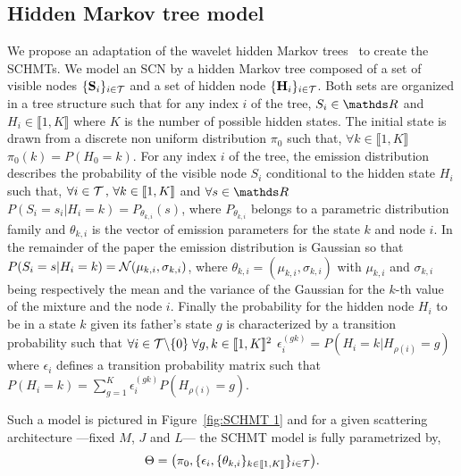 \documentclass{article}
\begin{document}
  \subsection{Hidden Markov tree model}
    \label{subsec:SCHMT/HMT model}
    We propose an adaptation of the wavelet hidden Markov trees~\cite{Crouse and Durand} to create the SCHMTs. We model an SCN by a hidden Markov tree composed of a set of visible nodes $\{{\bf S}_{i}\}_{i \in \mathcal{T}}$ and a set of hidden node $\{{\bf H}_{i}\}_{i \in \mathcal{T}}$. Both sets are organized in a tree structure such that for any index $i$ of the tree, $S_{i} \in \dsR$ and $H_{i} \in \llbracket 1,K \rrbracket$ where $K$ is the number of possible hidden states.
    The initial state is drawn from a discrete non uniform distribution $\pi_{0}$ such that, $\forall k \in \llbracket 1,K \rrbracket$ $\pi_{0}(k) = P(H_{0}=k)$.
    For any index $i$ of the tree, the emission distribution describes the probability of the visible node $S_{i}$ conditional to the hidden state $H_{i}$ such that, $\forall i \in \mathcal{T} \, ,\, \forall k \in \llbracket1,K\rrbracket$ and $\forall s \in \dsR$ $P(S_{i}=s_{i}|H_{i}=k) = P_{\theta_{k,i}}(s)$, where $P_{\theta_{k,i}}$ belongs to a parametric distribution family and $\theta_{k,i}$ is the vector of emission parameters for the state $k$ and node $i$. In the remainder of the paper the emission distribution is Gaussian so that $P(S_{i}=s | H_{i}=k) = \mathcal{N}(\mu_{k,i},\sigma_{k,i})$, where $\theta_{k,i}=(\mu_{k,i},\sigma_{k,i})$ with $\mu_{k,i}$ and $\sigma_{k,i}$ being respectively the mean and the variance of the Gaussian for the $k$-th value of the mixture and the node $i$.
    Finally the probability for the hidden node $H_{i}$ to be in a state $k$ given its father's state $g$ is characterized by a transition probability such that $\forall i \in \mathcal{T} \backslash \{ 0 \} \; \forall g,k \in \llbracket1,K\rrbracket^{2}$ $\epsilon_{i}^{(gk)} = P(H_{i}= k | H_{\rho(i)}=g)$ where $\epsilon_{i}$ defines a transition probability matrix such that $P(H_{i}=k) = \sum_{g=1}^{K} \epsilon_{i}^{(gk)} P(H_{\rho(i)}=g)$.

    Such a model is pictured in Figure~\ref{fig:SCHMT 1} and for a given scattering architecture ---\ie fixed $M$, $J$ and $L$--- the SCHMT model is fully parametrized by,
    \vspace{-5pt}
    \begin{equation}
      \Theta = \big(\pi_{0}, \{ \epsilon_{i}, \{ \theta_{k,i} \}_{k\in\llbracket1,K\rrbracket} \}_{i\in\mathcal{T}}\big).
      \label{eq:SCHMT - parameters}
    \end{equation}
    \vspace{-15pt}
\end{document}

